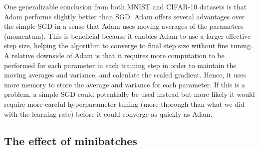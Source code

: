 \documentclass[10pt,twocolumn,letterpaper]{article}
\begin{document}
One generalizable conclusion from both MNIST and CIFAR-10 datasets is that Adam performs slightly better than SGD. Adam offers several advantages over the simple SGD in a sense that Adam uses moving averages of the parameters (momentum). This is beneficial because it enables Adam to use a larger effective step size, helping the algorithm to converge to final step size without fine tuning. A relative downside of Adam is that it requires more computation to be performed for each parameter in each training step in order to maintain the moving averages and variance, and calculate the scaled gradient. Hence, it uses more memory to store the average and variance for each parameter. If this is a problem, a simple SGD could potentially be used instead but more likely it would require more careful hyperparameter tuning (more thorough than what we did with the learning rate) before it could converge as quickly as Adam.

\subsection{The effect of minibatches}  
\end{document}
